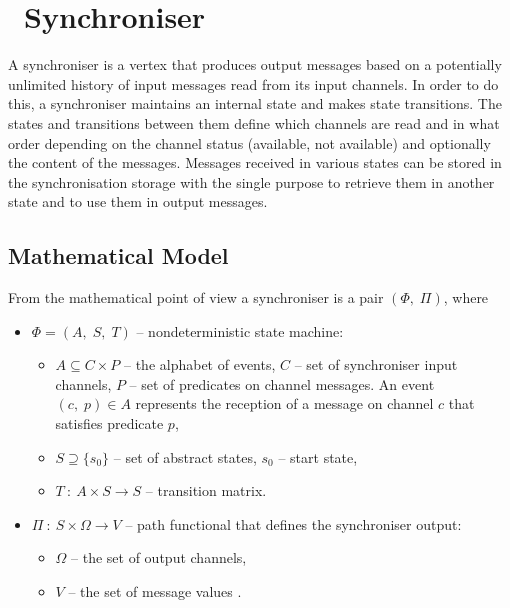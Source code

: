 \chapter{\ak\ Synchroniser}
A synchroniser is a vertex that produces output messages based on a potentially unlimited history of input messages read from its input channels. In order to do this, a synchroniser maintains an internal state and makes state transitions. The states and transitions between them define which channels are read and in what order depending on the channel status (available, not available) and optionally the content of the messages. Messages received in various states can be stored in the synchronisation storage with the single purpose to retrieve them in another state and to use them in output messages.

    \section{Mathematical Model}
From the mathematical point of view a synchroniser is a pair $(\Phi, \; \Pi)$, where
  \begin{itemize}
  \item[] $\Phi = (A, \; S, \; T)$ -- nondeterministic state machine:
    \begin{itemize}
    \item[] $A \subseteq C \times P$ -- the alphabet of events, $C$ -- set of synchroniser input channels, $P$ -- set of predicates on channel messages. An event $(c, \; p) \in A$ represents the reception of a message on channel $c$ that satisfies predicate $p$,
    \item[] $S \supseteq \{s_{0}\}$ -- set of abstract states, $s_{0}$ -- start state,
    \item[] $T \: : \: A \times S \to S$ -- transition matrix.
    \end{itemize}
  \item[] $\Pi \: : \: S \times \Omega \to V$ -- path functional that defines the synchroniser output:
    \begin{itemize}
    \item[] $\Omega$ -- the set of output channels,
    \item[] $V$ -- the set of message values \cite{astrakahn}.
    \end{itemize}
  \end{itemize}

